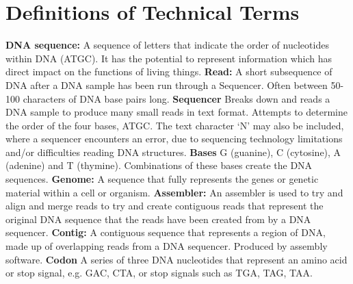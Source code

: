 \chapter{Definitions of Technical Terms}
\textbf{DNA sequence:}
A sequence of letters that indicate the order of nucleotides within DNA (ATGC). It has the potential to represent information which has direct impact on the functions of living things.
\newline
\textbf{Read:}
A short subsequence of DNA after a DNA sample has been run through a Sequencer. Often between 50-100 characters of DNA base pairs long.
\newline
\textbf{Sequencer}
Breaks down and reads a DNA sample to produce many small reads in text format. Attempts to determine the order of the four bases, ATGC. The text character `N' may also be included, where a sequencer encounters an error, due to sequencing technology limitations and/or difficulties reading DNA structures.
\newline
\textbf{Bases}
G (guanine), C (cytosine), A (adenine) and T (thymine). Combinations of these bases create the DNA sequences.
\newline
\textbf{Genome:}
A sequence that fully represents the genes or genetic material within a cell or organism.
\newline
\textbf{Assembler:}
An assembler is used to try and align and merge reads to try and create contiguous reads that represent the original DNA sequence that the reads have been created from by a DNA sequencer.
\newline
\textbf{Contig:}
A contiguous sequence that represents a region of DNA, made up of overlapping reads from a DNA sequencer. Produced by assembly software.
\newline
\textbf{Codon}
A series of three DNA nucleotides that represent an amino acid or stop signal, e.g. GAC, CTA, or stop signals such as TGA, TAG, TAA.